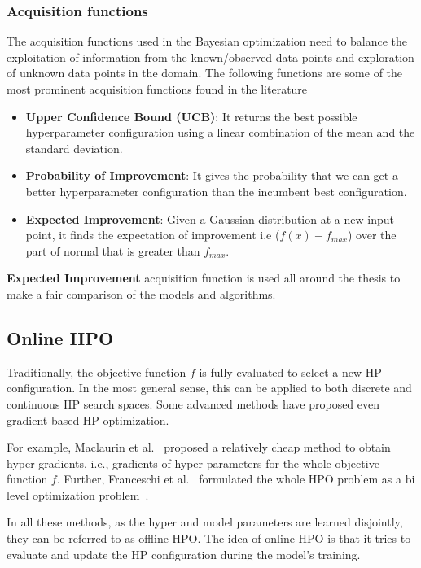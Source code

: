 \documentclass[12pt, twoside, ngerman]{report}
\begin{document}
\subsubsection{Acquisition functions}
The acquisition functions used in the Bayesian optimization need to balance the exploitation of information from the known/observed data points and exploration of unknown data points in the domain.
The following functions are some of the most prominent acquisition functions found in the literature~\cite{GPTutorial}
\begin{itemize}
\item \textbf{Upper Confidence Bound (UCB)}: It returns the best possible hyperparameter configuration using a linear combination of the mean and the standard deviation.
\item \textbf{Probability of Improvement}: It gives the probability that we can get a better hyperparameter configuration than the incumbent best configuration.
\item \textbf{Expected Improvement}: Given a Gaussian distribution at a new input point, it finds the expectation of improvement i.e ($f(x) - f_{max}$) over the part of normal that is greater than $f_{max}$.
\end{itemize}

 \textbf{Expected Improvement} acquisition function is used all around the thesis to make a fair comparison of the models and algorithms.


\subsection{Online HPO}
Traditionally, the objective function $f$ is fully evaluated to select a new HP configuration.
In the most general sense, this can be applied to both discrete and continuous HP search spaces.
Some advanced methods have proposed even gradient-based HP optimization.

For example,  Maclaurin et al.~\cite{hypergradient} proposed a relatively cheap method to obtain hyper gradients, i.e., gradients of hyper parameters for the whole objective function $f$.
Further,  Franceschi et al.~\cite{HPOAsBilevelOptimization} formulated the whole HPO problem as a bi level optimization problem~\cite{hutterneuripstutorial}.

In all these methods, as the hyper and model parameters are learned disjointly, they can be referred to as offline HPO.
The idea of online HPO is that it tries to evaluate and update the HP configuration during the model's training.
\end{document}
